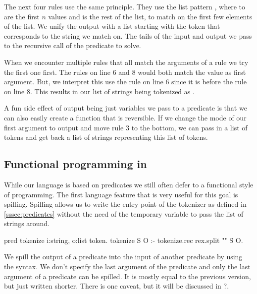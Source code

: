 \documentclass[thesis.tex]{subfiles}
\begin{document}
{The next four rules use the same principle. They use the list pattern \elpii{[E1, ..., En | TL]}, where  to  are the first $n$ values and  is the rest of the list, to match on the first few elements of the list. We unify the output with a list starting with the token that corresponds to the string we match on. The tails of the input and output we pass to the recursive call of the predicate to solve.

When we encounter multiple rules that all match the arguments of a rule we try the first one first. The rules on line 6 and 8 would both match the value \elpii{["/", "/", "="]} as first argument. But, we interpret this use the rule on line 6 since it is before the rule on line 8. This results in our list of strings being tokenized as .

A fun side effect of output being just variables we pass to a predicate is that we can also easily create a function that is reversible. If we change the mode of our first argument to output and move rule 3 to the bottom, we can pass in a list of tokens and get back a list of strings representing this list of tokens.

\subsection{Functional programming in \elpi}
While our language is based on predicates we still often defer to a functional style of programming. The first language feature that is very useful for this goal is spilling. Spilling allows us to write the entry point of the tokenizer as defined in \cref*{sssec:predicates} without the need of the temporary variable to pass the list of strings around.
\begin{elpicode}
  pred tokenize i:string, o:list token.
  tokenize S O :- tokenize.rec {rex.split "" S} O.
\end{elpicode}

We spill the output of a predicate into the input of another predicate by using the \elpii{{ }} syntax. We don't specify the last argument of the predicate and only the last argument of a predicate can be spilled. It is mostly equal to the previous version, but just written shorter. There is one caveat, but it will be discussed in ?.

}
\end{document}

